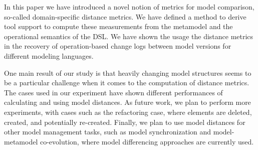 In this paper we have introduced a novel notion of metrics for model comparison, so-called domain-specific distance metrics.
We have defined a method to derive tool support to compute these measurements from the metamodel and the operational semantics of the DSL.
We have shown the usage the distance metrics in the recovery of operation-based change logs between model versions for different modeling languages.

One main result of our study is that heavily changing model structures seems to be a particular challenge when it comes to the computation of distance metrics.
The cases used in our experiment have shown different performances of calculating and using model distances.
As future work, we plan to perform more experiments, with cases such as the refactoring case, where elements are deleted, created, and potentially re-created.
Finally, we plan to use model distances for other model management tasks, such as model synchronization and model-metamodel co-evolution, where model differencing approaches are currently used.